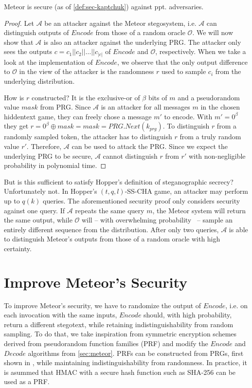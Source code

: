 \begin{theorem}
	Meteor is secure (as of \autoref{def:sec-kaptchuk}) against ppt. adversaries. 
\end{theorem}
\begin{proof}
	Let $\mathcal{A}$ be an attacker against the Meteor stegosystem, i.e. $\mathcal{A}$ can distinguish outputs of $Encode$ from those of a random oracle $\mathcal{O}$. 
	We will now show that $\mathcal{A}$ is also an attacker against the underlying PRG.
	The attacker only sees the outputs $c = c_1 ||c_2 || \dots || c_{|c|}$ of $Encode$ and $\mathcal{O}$, respectively. 
	When we take a look at the implementation of $Encode$, we observe that the only output difference to $\mathcal{O}$ in the view of the attacker is the randomness $r$ used to sample $c_i$ from the underlying distribution.
	
	How is $r$ constructed? 
	It is the exclusive-or of $\beta$ bits of $m$ and a pseudorandom value $mask$ from PRG.
	Since $\mathcal{A}$ is an attacker for all messages $m$ in the chosen hiddentext game, they can freely chose a message $m'$ to encode.
	With $m' = 0^\beta$ they get $r = 0^\beta \oplus mask = mask = PRG.Next(k_{prg})$.
	To distinguish $r$ from a randomly sampled token, the attacker has to distinguish $r$ from a truly random value $r'$.
	Therefore, $\mathcal{A}$ can be used to attack the PRG.
	Since we expect the underlying PRG to be secure, $\mathcal{A}$ cannot distinguish $r$ from $r'$ with non-negligible probability in polynomial time.
\end{proof}

But is this sufficient to satisfy Hopper's definition of steganographic secrecy?
Unfortunately not.
In Hopper's $(t,q,l)$-SS-CHA game, an attacker may perform up to $q(k)$ queries.
The aforementioned security proof only considers security against one query.
If $\mathcal{A}$ repeats the same query $m$, the Meteor system will return the same output, while $\mathcal{O}$ will -- with overwhelming probability~ -- sample an entirely different sequence from the distribution.
After only two queries, $\mathcal{A}$ is able to distinguish Meteor's outputs from those of a random oracle with high certainty.

\section{Improve Meteor's Security}

To improve Meteor's security, we have to randomize the output of $Encode$, i.e. on each invocation with the same inputs, $Encode$ should, with high probability, return a different stegotext, while retaining indistinguishability from random sampling.
To do that, we take inspiration from symmetric encryption schemes derived from pseudorandom function families (PRF) and modify the $Encode$ and $Decode$ algorithms from \autoref{sec:meteor}. 
PRFs can be constructed from PRGs, first shown in \cite{PRF1986}, while maintaining indistinguishability from randomness.
In practice, it is asummed that HMAC with a secure hash function such as SHA-256 can be used as a PRF.

